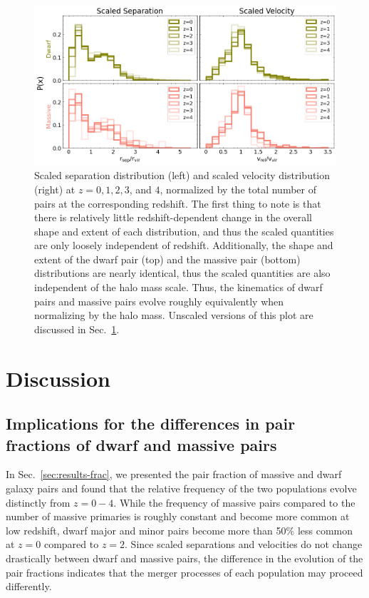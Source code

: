 \documentclass[twocolumn]{aastex631}
\begin{document}
    \begin{figure}[htp]
      \centering
      \includegraphics[width=\textwidth]{scaledcombodist_1000.png}
      \caption{
          Scaled separation distribution (left) and scaled velocity distribution (right) at $z=0,1,2,3$, and $4$, normalized by the total number of pairs at the corresponding redshift. 
          The first thing to note is that there is relatively little redshift-dependent change in the overall shape and extent of each distribution, and thus the scaled quantities are only loosely independent of redshift. 
          Additionally, the shape and extent of the dwarf pair (top) and the massive pair (bottom) distributions are nearly identical, thus the scaled quantities are also independent of the halo mass scale. Thus, the kinematics of dwarf pairs and massive pairs evolve roughly equivalently when normalizing by the halo mass.
          Unscaled versions of this plot are discussed in Sec.~\ref{sec:discussion}.
      }
      \label{fig:scaled-dist}
    \end{figure} 
    



\section{Discussion}\label{sec:discussion}
\subsection{Implications for the differences in pair fractions of dwarf and massive pairs}
In Sec.~\ref{sec:results-frac}, we presented the pair fraction of massive and dwarf galaxy pairs and found that the relative frequency of the two populations evolve distinctly from $z=0-4$. 
While the frequency of massive pairs compared to the number of massive primaries is roughly constant and become more common at low redshift, dwarf major and minor pairs become more than 50\% less common at $z=0$ compared to $z=2$. 
Since scaled separations and velocities do not change drastically between dwarf and massive pairs, the difference in the evolution of the pair fractions indicates that the merger processes of each population may proceed differently.
\end{document}

